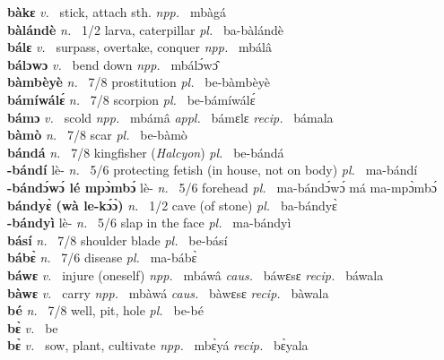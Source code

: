{\bfseries bàkɛ}  {\itshape v.~} stick, attach sth.   {\itshape npp.~} mbàgá  \\ 
{\bfseries bàlándè} {\itshape n.~} 1/2 larva, caterpillar {\itshape pl.~} ba-bàlándè    \\ 
{\bfseries bálɛ}  {\itshape v.~} surpass, overtake, conquer   {\itshape npp.~} mbálâ  \\ 
{\bfseries bálɔwɔ}  {\itshape v.~} bend down   {\itshape npp.~} mbálɔ́wɔ̂  \\ 
{\bfseries bàmbèyè}  {\itshape n.~} 7/8 prostitution {\itshape pl.~} be-bàmbèyè    \\ 
{\bfseries bámíwálɛ́}  {\itshape n.~} 7/8 scorpion {\itshape pl.~} be-bámíwálɛ́    \\ 
{\bfseries bámɔ}  {\itshape v.~} scold   {\itshape npp.~} mbámâ {\itshape appl.~} bámɛlɛ {\itshape recip.~} bámala  \\ 
{\bfseries bàmò}  {\itshape n.~} 7/8 scar {\itshape pl.~} be-bàmò    \\ 
{\bfseries bándá}  {\itshape n.~} 7/8 kingfisher ({\itshape Halcyon}) {\itshape pl.~} be-bándá    \\ 
{\bfseries -bándí} lè- {\itshape n.~} 5/6 protecting fetish (in house, not on body) {\itshape pl.~} ma-bándí    \\ 
{\bfseries -bándɔ́wɔ́ lé mpɔ̀mbɔ́} lè- {\itshape n.~} 5/6 forehead {\itshape pl.~} ma-bándɔ́wɔ́ má ma-mpɔ̀mbɔ́    \\ 
{\bfseries bándyɛ̀ (wà le-kɔ́ɔ̀)}  {\itshape n.~} 1/2 cave (of stone) {\itshape pl.~} ba-bándyɛ̀    \\ 
{\bfseries -bándyì} lè- {\itshape n.~} 5/6 slap in the face  {\itshape pl.~} ma-bándyì    \\ 
{\bfseries básí}  {\itshape n.~} 7/8 shoulder blade {\itshape pl.~} be-básí    \\ 
{\bfseries bábɛ̀}  {\itshape n.~} 7/6 disease {\itshape pl.~} ma-bábɛ̀    \\ 
{\bfseries báwɛ}  {\itshape v.~} injure (oneself)   {\itshape npp.~} mbáwâ {\itshape caus.~} báwɛsɛ {\itshape recip.~} báwala  \\ 
{\bfseries bàwɛ}  {\itshape v.~} carry   {\itshape npp.~} mbàwá {\itshape caus.~} bàwɛsɛ {\itshape recip.~} bàwala  \\ 
{\bfseries bé}  {\itshape n.~} 7/8 well, pit, hole {\itshape pl.~} be-bé    \\ 
{\bfseries bɛ̀}  {\itshape v.~} be    \\ 
{\bfseries bɛ̀}  {\itshape v.~} sow, plant, cultivate   {\itshape npp.~} mbɛ̀yá {\itshape recip.~} bɛ̀yala  \\ 
